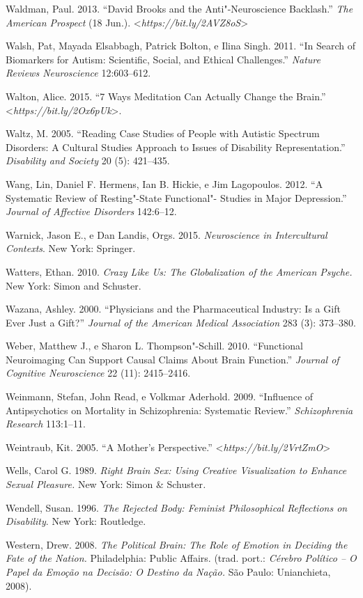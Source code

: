 {\begin{Parskip}
Waldman, Paul. 2013. ``David Brooks and the Anti"-Neuroscience
Backlash.'' \emph{The American Prospect} (18 Jun.).
\textless{}\emph{https://bit.ly/2AVZ8oS}\textgreater{}

Walsh, Pat, Mayada Elsabbagh, Patrick Bolton, e Ilina Singh. 2011. ``In
Search of Biomarkers for Autism: Scientific, Social, and Ethical
Challenges.'' \emph{Nature Reviews Neuroscience} 12:603--612.

Walton, Alice. 2015. ``7 Ways Meditation Can Actually Change the
Brain.''
\textless{}\emph{https://bit.ly/2Ox6pUk}\textgreater{}.

Waltz, M. 2005. ``Reading Case Studies of People with Autistic Spectrum
Disorders: A Cultural Studies Approach to Issues of Disability
Representation.'' \emph{Disability and Society} 20 (5): 421--435.

Wang, Lin, Daniel F. Hermens, Ian B. Hickie, e Jim Lagopoulos. 2012. ``A
Systematic Review of Resting"-State Functional"- Studies in Major
Depression.'' \emph{Journal of Affective Disorders} 142:6--12.

Warnick, Jason E., e Dan Landis, Orgs. 2015. \emph{Neuroscience in
Intercultural Contexts}. New York: Springer.

Watters, Ethan. 2010. \emph{Crazy Like Us: The Globalization of the
American Psyche.} New York: Simon and Schuster.

Wazana, Ashley. 2000. ``Physicians and the Pharmaceutical Industry: Is a
Gift Ever Just a Gift?'' \emph{Journal of the American Medical
Association} 283 (3): 373--380.

Weber, Matthew J., e Sharon L. Thompson"-Schill. 2010. ``Functional
Neuroimaging Can Support Causal Claims About Brain Function.''
\emph{Journal of Cognitive Neuroscience} 22 (11): 2415--2416.

Weinmann, Stefan, John Read, e Volkmar Aderhold. 2009. ``Influence of
Antipsychotics on Mortality in Schizophrenia: Systematic Review.''
\emph{Schizophrenia Research} 113:1--11.

Weintraub, Kit. 2005. ``A Mother's Perspective.''
\textless{}\emph{https://bit.ly/2VrtZmO}\textgreater{}

Wells, Carol G. 1989. \emph{Right Brain Sex: Using Creative
Visualization to Enhance Sexual Pleasure.} New York: Simon \&
Schuster\emph{. }

Wendell, Susan. 1996. \emph{The Rejected Body: Feminist Philosophical
Reflections on Disability}. New York: Routledge.

Western, Drew. 2008. \emph{The Political Brain: The Role of Emotion in
Deciding the Fate of the Nation.} Philadelphia: Public Affairs. (trad.
port.: \emph{Cérebro Político -- O Papel da Emoção na Decisão: O Destino
da Nação.} São Paulo: Unianchieta, 2008).


\end{Parskip}}
